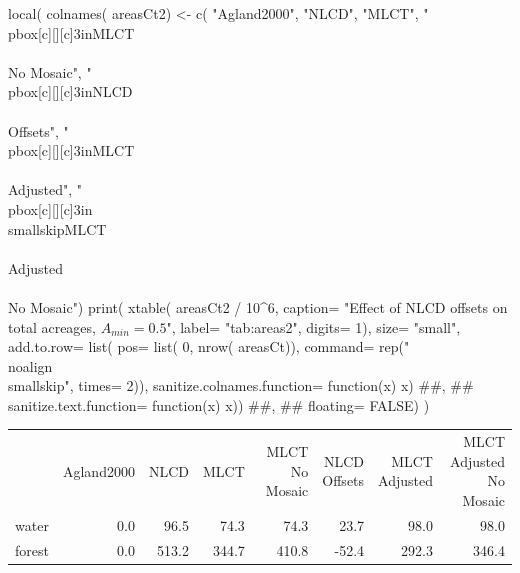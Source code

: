 \begin{Schunk}
\begin{Sinput}
 local({
   colnames( areasCt2) <- c( "Agland2000", "NLCD", "MLCT", 
                            "\\pbox[c][][c]{3in}{MLCT\\\\No Mosaic}",
                            "\\pbox[c][][c]{3in}{NLCD\\\\Offsets}", 
                            "\\pbox[c][][c]{3in}{MLCT\\\\Adjusted}",
                            "\\pbox[c][][c]{3in}{\\smallskip{}MLCT\\\\Adjusted\\\\No Mosaic}")
   print( xtable( areasCt2 / 10^6, 
                 caption= "Effect of NLCD offsets on total acreages, $A_{min}=0.5$",
                 label= "tab:areas2",
                 digits= 1),
         size= "small",
         add.to.row= list( 
           pos= list( 0, nrow( areasCt)),
           command= rep("\\noalign{\\smallskip}", times= 2)),        
         sanitize.colnames.function= function(x) x)
         ##,
         ##        sanitize.text.function= function(x) x))
   ##,
   ##      floating= FALSE)
 })
\end{Sinput}
\begin{table}[ht]
\begin{center}
{\small
\begin{tabular}{rrrrrrrr}
  \hline
 & Agland2000 & NLCD & MLCT & \pbox[c][][c]{3in}{MLCT\\No Mosaic} & \pbox[c][][c]{3in}{NLCD\\Offsets} & \pbox[c][][c]{3in}{MLCT\\Adjusted} & \pbox[c][][c]{3in}{\smallskip{}MLCT\\Adjusted\\No Mosaic} \\ 
  \noalign{\smallskip} \hline
water & 0.0 & 96.5 & 74.3 & 74.3 & 23.7 & 98.0 & 98.0 \\ 
  forest & 0.0 & 513.2 & 344.7 & 410.8 & -52.4 & 292.3 & 346.4 \\ 

\end{tabular}}
\end{center}
\end{table}
\end{Schunk}
